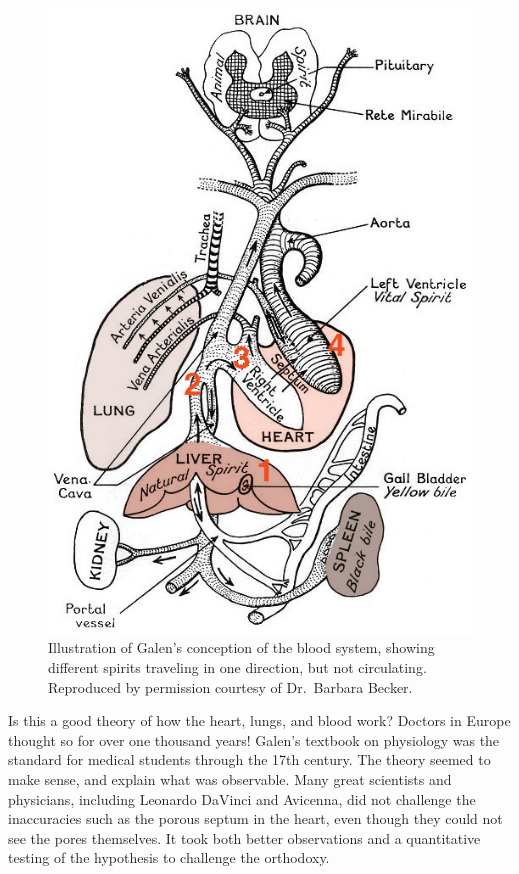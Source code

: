 \documentclass[
]{book}
\begin{document}
\begin{figure}
\centering
\includegraphics{ch1/galenheartc.png}
\caption{Illustration of Galen's conception of the blood system, showing different spirits traveling in one direction, but not circulating. Reproduced by permission courtesy of Dr.~Barbara Becker.}
\end{figure}

Is this a good theory of how the heart, lungs, and blood work? Doctors in Europe thought so for over one thousand years! Galen's textbook on physiology was the standard for medical students through the 17th century. The theory seemed to make sense, and explain what was observable. Many great scientists and physicians, including Leonardo DaVinci and Avicenna, did not challenge the inaccuracies such as the porous septum in the heart, even though they could not see the pores themselves. It took both better observations and a quantitative testing of the hypothesis to challenge the orthodoxy.
\end{document}

